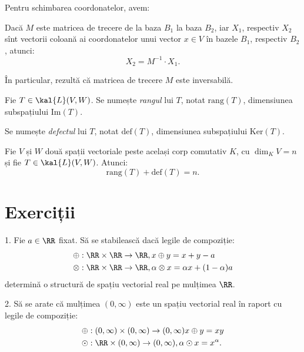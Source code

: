 Pentru schimbarea coordonatelor, avem:
\begin{theorem}
Dacă $M$ este matricea de trecere de la baza $B_1$ la baza $B_2$, iar $X_1$, 
respectiv $X_2$ sînt vectorii coloană ai coordonatelor unui vector $x \in V$ în 
bazele $B_1$, respectiv $B_2$, atunci: 
\[
X_2 = M^{-1} \cdot X_1.
\]

În particular, rezultă că matricea de trecere $M$ este inversabilă.
\end{theorem}

\begin{definition}\label{def:rang-defect}
  Fie $T \in \kal{L}(V, W)$. Se numește \emph{rangul} lui $T$, notat $\mathrm{rang}(T)$,
  dimensiunea subspațiului $\mathrm{Im}(T)$.

  Se numește \emph{defectul} lui $T$, notat $\mathrm{def}(T)$, dimensiunea subspațiului
  $\mathrm{Ker}(T)$.
\end{definition}
\begin{theorem}\label{thm:rang-defect}
  Fie $V$ și $W$ două spații vectoriale peste același corp comutativ $K$,
  cu $\dim_K V = n$ și fie $T \in \kal{L}(V, W)$. Atunci:
  \[
    \mathrm{rang}(T) + \mathrm{def}(T) = n.
  \]
\end{theorem}


\section{Exerciții}

1. Fie $a \in \RR$ fixat. Să se stabilească dacă legile de compoziție:
\begin{align*}
  & \oplus : \RR \times \RR \to \RR, x \oplus y = x + y - a \\
  & \otimes : \RR \times \RR \to \RR, \alpha \otimes x = \alpha x + (1 - \alpha) a
\end{align*}
determină o structură de spațiu vectorial real pe mulțimea $\RR$.

\vspace{1cm}

2. Să se arate că mulțimea $(0, \infty)$ este un spațiu vectorial real în raport
cu legile de compoziție:
\begin{align*}
  & \oplus : (0, \infty) \times (0, \infty) \to (0, \infty) x \oplus y = xy \\
  & \odot : \RR \times (0, \infty) \to (0, \infty), \alpha \odot x = x^\alpha.
\end{align*}

